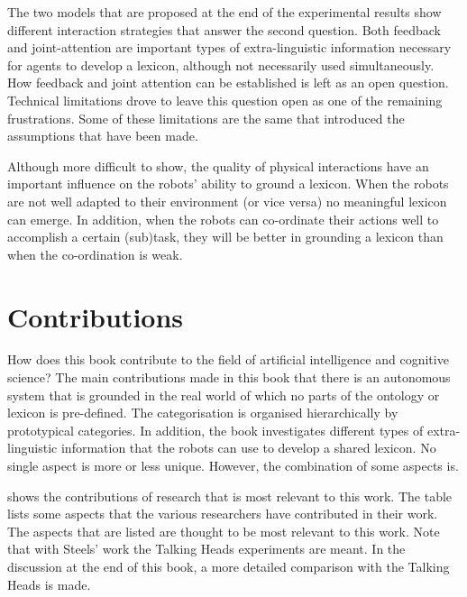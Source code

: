 The two models that are proposed at the end of the experimental results show different interaction strategies that answer the second question. Both feedback and joint-attention are important types of extra-linguistic information necessary for agents to develop a lexicon, although not necessarily used simultaneously. How feedback and joint attention can be established is left as an open question. Technical limitations drove to leave this question open as one of the remaining frustrations. Some of these limitations are the same that introduced the assumptions that have been made. 

Although more difficult to show, the quality of physical interactions have an important influence on the robots' ability to ground a lexicon. When the robots are not well adapted to their environment (or vice versa) no meaningful lexicon can emerge. In addition, when the robots can co-ordinate their actions well to accomplish a certain (sub)task, they will be better in grounding a lexicon than when the co-ordination is weak.

\section{Contributions}

How does this book contribute to the field of artificial intelligence and cognitive science? The main contributions made in this book that there is an autonomous system that is grounded in the real world of which no parts of the ontology or lexicon is pre-defined. The categorisation is organised hierarchically by prototypical categories. In addition, the book investigates different types of extra-linguistic information that the robots can use to develop a shared lexicon. No single aspect is more or less unique. However, the combination of some aspects is.

 shows the contributions of research that is most relevant to this work. The table lists some aspects that the various researchers have contributed in their work. The aspects that are listed are thought to be most relevant to this work. Note that with Steels' work the Talking Heads experiments are meant. In the discussion at the end of this book, a more detailed comparison with the Talking Heads is made.

